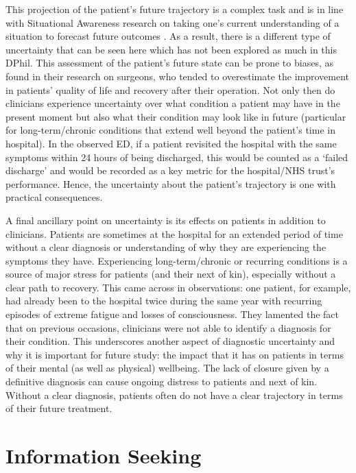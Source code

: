 \documentclass[a4paper, nobind]{templates/ociamthesis}
\begin{document}
\hfill\break
This projection of the patient's future trajectory is a complex task and is in line with Situational Awareness research on taking one's current understanding of a situation to forecast future outcomes \autocite{endsley_toward_1995}. As a result, there is a different type of uncertainty that can be seen here which has not been explored as much in this DPhil. This assessment of the patient's future state can be prone to biases, as \textcite{graz_prognosis_2005} found in their research on surgeons, who tended to overestimate the improvement in patients' quality of life and recovery after their operation. Not only then do clinicians experience uncertainty over what condition a patient may have in the present moment but also what their condition may look like in future (particular for long-term/chronic conditions that extend well beyond the patient's time in hospital). In the observed ED, if a patient revisited the hospital with the same symptoms within 24 hours of being discharged, this would be counted as a `failed discharge' and would be recorded as a key metric for the hospital/NHS trust's performance. Hence, the uncertainty about the patient's trajectory is one with practical consequences.

\hfill\break
A final ancillary point on uncertainty is its effects on patients in addition to clinicians. Patients are sometimes at the hospital for an extended period of time without a clear diagnosis or understanding of why they are experiencing the symptoms they have. Experiencing long-term/chronic or recurring conditions is a source of major stress for patients (and their next of kin), especially without a clear path to recovery. This came across in observations: one patient, for example, had already been to the hospital twice during the same year with recurring episodes of extreme fatigue and losses of consciousness. They lamented the fact that on previous occasions, clinicians were not able to identify a diagnosis for their condition. This underscores another aspect of diagnostic uncertainty and why it is important for future study: the impact that it has on patients in terms of their mental (as well as physical) wellbeing. The lack of closure given by a definitive diagnosis can cause ongoing distress to patients and next of kin. Without a clear diagnosis, patients often do not have a clear trajectory in terms of their future treatment.

\section{Information Seeking}\label{information-seeking-1}
\end{document}
